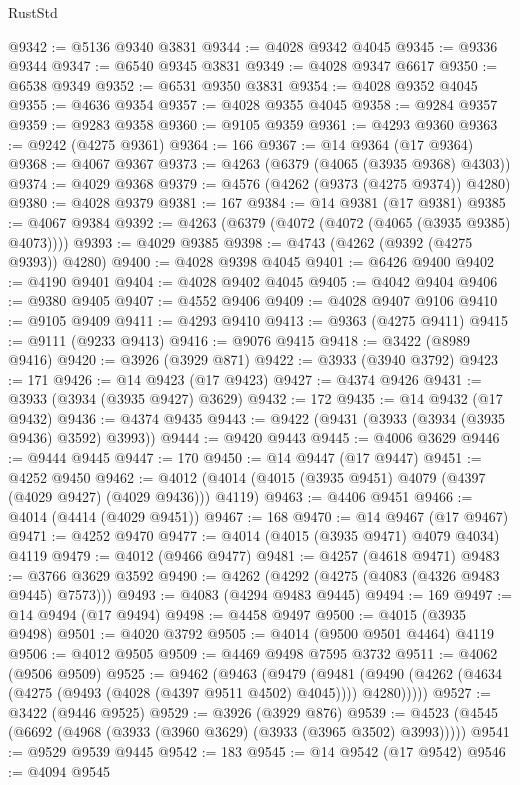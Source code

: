 \begin{lexlean}{RustStd}
\begin{coremodule}
@9342 := @5136 @9340 @3831
@9344 := @4028 @9342 @4045
@9345 := @9336 @9344
@9347 := @6540 @9345 @3831
@9349 := @4028 @9347 @6617
@9350 := @6538 @9349
@9352 := @6531 @9350 @3831
@9354 := @4028 @9352 @4045
@9355 := @4636 @9354
@9357 := @4028 @9355 @4045
@9358 := @9284 @9357
@9359 := @9283 @9358
@9360 := @9105 @9359
@9361 := @4293 @9360
@9363 := @9242 (@4275 @9361)
@9364 := 166
@9367 := @14 @9364 (@17 @9364)
@9368 := @4067 @9367
@9373 := @4263 (@6379 (@4065 (@3935 @9368) @4303))
@9374 := @4029 @9368
@9379 := @4576 (@4262 (@9373 (@4275 @9374)) @4280)
@9380 := @4028 @9379
@9381 := 167
@9384 := @14 @9381 (@17 @9381)
@9385 := @4067 @9384
@9392 := @4263 (@6379 (@4072 (@4072 (@4065 (@3935 @9385) @4073))))
@9393 := @4029 @9385
@9398 := @4743 (@4262 (@9392 (@4275 @9393)) @4280)
@9400 := @4028 @9398 @4045
@9401 := @6426 @9400
@9402 := @4190 @9401
@9404 := @4028 @9402 @4045
@9405 := @4042 @9404
@9406 := @9380 @9405
@9407 := @4552 @9406
@9409 := @4028 @9407 @9106
@9410 := @9105 @9409
@9411 := @4293 @9410
@9413 := @9363 (@4275 @9411)
@9415 := @9111 (@9233 @9413)
@9416 := @9076 @9415
@9418 := @3422 (@8989 @9416)
@9420 := @3926 (@3929 @871)
@9422 := @3933 (@3940 @3792)
@9423 := 171
@9426 := @14 @9423 (@17 @9423)
@9427 := @4374 @9426
@9431 := @3933 (@3934 (@3935 @9427) @3629)
@9432 := 172
@9435 := @14 @9432 (@17 @9432)
@9436 := @4374 @9435
@9443 := @9422 (@9431 (@3933 (@3934 (@3935 @9436) @3592) @3993))
@9444 := @9420 @9443
@9445 := @4006 @3629
@9446 := @9444 @9445
@9447 := 170
@9450 := @14 @9447 (@17 @9447)
@9451 := @4252 @9450
@9462 := @4012 (@4014 (@4015 (@3935 @9451) @4079 (@4397 (@4029 @9427) (@4029 @9436))) @4119)
@9463 := @4406 @9451
@9466 := @4014 (@4414 (@4029 @9451))
@9467 := 168
@9470 := @14 @9467 (@17 @9467)
@9471 := @4252 @9470
@9477 := @4014 (@4015 (@3935 @9471) @4079 @4034) @4119
@9479 := @4012 (@9466 @9477)
@9481 := @4257 (@4618 @9471)
@9483 := @3766 @3629 @3592
@9490 := @4262 (@4292 (@4275 (@4083 (@4326 @9483 @9445) @7573)))
@9493 := @4083 (@4294 @9483 @9445)
@9494 := 169
@9497 := @14 @9494 (@17 @9494)
@9498 := @4458 @9497
@9500 := @4015 (@3935 @9498)
@9501 := @4020 @3792
@9505 := @4014 (@9500 @9501 @4464) @4119
@9506 := @4012 @9505
@9509 := @4469 @9498 @7595 @3732
@9511 := @4062 (@9506 @9509)
@9525 := @9462
    (@9463
      (@9479
        (@9481 (@9490 (@4262 (@4634 (@4275 (@9493 (@4028 (@4397 @9511 @4502) @4045)))) @4280)))))
@9527 := @3422 (@9446 @9525)
@9529 := @3926 (@3929 @876)
@9539 := @4523 (@4545 (@6692 (@4968 (@3933 (@3960 @3629) (@3933 (@3965 @3502) @3993)))))
@9541 := @9529 @9539 @9445
@9542 := 183
@9545 := @14 @9542 (@17 @9542)
@9546 := @4094 @9545

\end{coremodule}
\end{lexlean}
